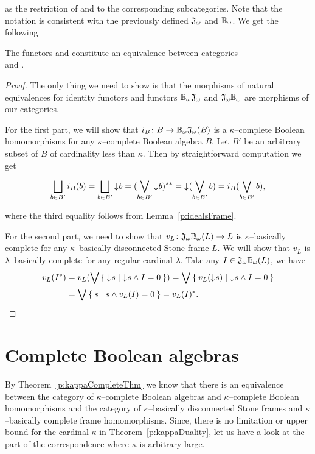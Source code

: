 \noindent as the restriction of \JO{} and \BcO{} to the corresponding subcategories. Note that the notation is consistent with the previously defined $\mathfrak{J}_{\omega}$ and $\mathbb{B}_{\omega}$. We get the following

\begin{theorem*}\label{p:kappaDuality}
    The functors \JK{} and \BcK{} constitute an equivalence between categories \\ \kComplBool{} and \kBDStoneFrm.
\end{theorem*}
\begin{proof}
    The only thing we need to show is that the morphisms of natural equivalences for identity functors and functors $\mathbb{B}_{\omega}\mathfrak{J}_{\omega}$ and $\mathfrak{J}_{\omega}\mathbb{B}_{\omega}$ are morphisms of our categories.

    For the first part, we will show that $i_B\colon B \to \mathbb{B}_{\omega}\mathfrak{J}_{\omega}(B)$ is a $\kappa$--complete Boolean homomorphisms for any $\kappa$--complete Boolean algebra $B$. Let $B'$ be an arbitrary subset of $B$ of cardinality less than $\kappa$. Then by straightforward computation we get

    $$
        \bigsqcup_{b\in B'} i_B(b) = \bigsqcup_{b\in B'} \mathord{\downarrow}\mkern1mu b = (\bigvee_{b\in B'} \mathord{\downarrow}\mkern1mu b)^{**} = \mathord{\downarrow}\mkern1mu (\bigvee_{b\in B'} b) = i_B(\bigvee_{b\in B'} b),
    $$

    \noindent where the third equality follows from Lemma~\ref{p:idealsFrame}.

    For the second part, we need to show that $v_L\colon \mathfrak{J}_{\omega}\mathbb{B}_{\omega}(L) \to L$ is $\kappa$--basically complete for any $\kappa$--basically disconnected Stone frame $L$. We will show that $v_L$ is $\lambda$--basically complete for any regular cardinal $\lambda$. Take any $I \in \mathfrak{J}_{\omega}\mathbb{B}_{\omega}(L)$, we have
    \begin{align*}
        v_L(I^*) &= v_L(\bigvee \Set{ \mathord{\downarrow}\mkern1mus | \mathord{\downarrow}\mkern1mus \wedge I = 0 })
                  = \bigvee \Set{ v_L(\mathord{\downarrow}\mkern1mus) | \mathord{\downarrow}\mkern1mus \wedge I = 0 } \\
                 &= \bigvee \Set{ s | s \wedge v_L(I) = 0 } = v_L(I)^*.
    \end{align*}
\end{proof}


\section{Complete Boolean algebras}

By Theorem~\ref{p:kappaCompleteThm} we know that there is an equivalence between the category of $\kappa$--complete Boolean algebras and $\kappa$--complete Boolean homomorphisms and the category of $\kappa$--basically disconnected Stone frames and $\kappa$--basically complete frame homomorphisms. Since, there is no limitation or upper bound for the cardinal $\kappa$ in Theorem~\ref{p:kappaDuality}, let us have a look at the part of the correspondence where $\kappa$ is arbitrary large.

